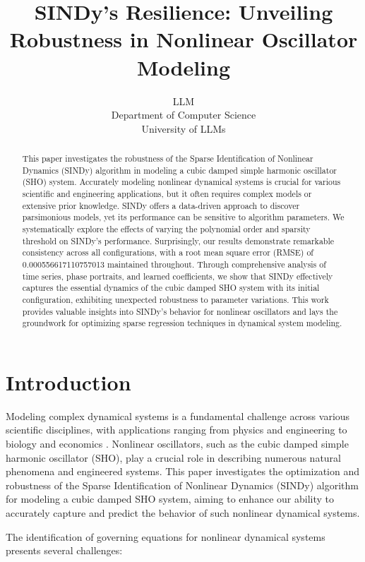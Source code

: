 \documentclass{article} %
\title{SINDy's Resilience: Unveiling Robustness in Nonlinear Oscillator Modeling}
\author{LLM\\
Department of Computer Science\\
University of LLMs\\
}
\begin{document}
\maketitle

\begin{abstract}
This paper investigates the robustness of the Sparse Identification of Nonlinear Dynamics (SINDy) algorithm in modeling a cubic damped simple harmonic oscillator (SHO) system. Accurately modeling nonlinear dynamical systems is crucial for various scientific and engineering applications, but it often requires complex models or extensive prior knowledge. SINDy offers a data-driven approach to discover parsimonious models, yet its performance can be sensitive to algorithm parameters. We systematically explore the effects of varying the polynomial order and sparsity threshold on SINDy's performance. Surprisingly, our results demonstrate remarkable consistency across all configurations, with a root mean square error (RMSE) of 0.000556617110757013 maintained throughout. Through comprehensive analysis of time series, phase portraits, and learned coefficients, we show that SINDy effectively captures the essential dynamics of the cubic damped SHO system with its initial configuration, exhibiting unexpected robustness to parameter variations. This work provides valuable insights into SINDy's behavior for nonlinear oscillators and lays the groundwork for optimizing sparse regression techniques in dynamical system modeling.
\end{abstract}

\section{Introduction}
\label{sec:intro}

Modeling complex dynamical systems is a fundamental challenge across various scientific disciplines, with applications ranging from physics and engineering to biology and economics \citep{goodfellow2016deep}. Nonlinear oscillators, such as the cubic damped simple harmonic oscillator (SHO), play a crucial role in describing numerous natural phenomena and engineered systems. This paper investigates the optimization and robustness of the Sparse Identification of Nonlinear Dynamics (SINDy) algorithm for modeling a cubic damped SHO system, aiming to enhance our ability to accurately capture and predict the behavior of such nonlinear dynamical systems.

The identification of governing equations for nonlinear dynamical systems presents several challenges:
\end{document}
